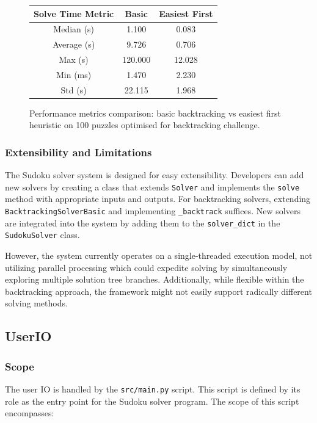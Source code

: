 \documentclass[11pt]{article}
\begin{document}
\begin{figure}[h!]
    \centering
    \begin{tabular}{|c|c|c|}
    \hline
    Solve Time Metric & Basic & Easiest First \\
    \hline
    Median (s) & 1.100 & 0.083 \\
    \hline
    Average (s) & 9.726 & 0.706 \\
    \hline
    Max (s) & 120.000 & 12.028 \\
    \hline
    Min (ms) & 1.470 & 2.230 \\
    \hline
    Std (s) & 22.115 & 1.968 \\
    \hline
    \end{tabular}
    \caption{Performance metrics comparison: basic backtracking vs easiest first heuristic on 100 puzzles optimised for backtracking challenge.}


\end{figure}

\subsubsection{Extensibility and Limitations}
The Sudoku solver system is designed for easy extensibility. Developers can add new solvers by creating a class that extends \texttt{Solver} and implements the \texttt{solve} method with appropriate inputs and outputs. For backtracking solvers, extending \texttt{BacktrackingSolverBasic} and implementing \texttt{\_backtrack} suffices. New solvers are integrated into the system by adding them to the \texttt{solver\_dict} in the \texttt{SudokuSolver} class.

However, the system currently operates on a single-threaded execution model, not utilizing parallel processing which could expedite solving by simultaneously exploring multiple solution tree branches. Additionally, while flexible within the backtracking approach, the framework might not easily support radically different solving methods.

\subsection{UserIO}
\subsubsection{Scope}
The user IO is handled by the \texttt{src/main.py} script. This script is defined by its role as the entry point for the Sudoku solver program. The scope of this script encompasses:
\end{document}
